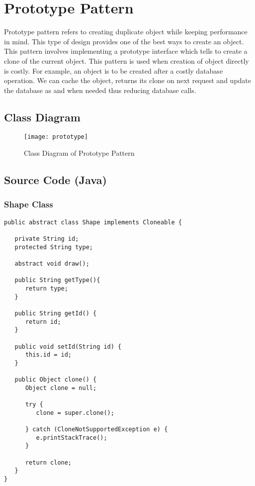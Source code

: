 \newpage
\section{Prototype Pattern}

Prototype pattern refers to creating duplicate object while keeping performance in mind. This type of design provides one of the best ways to create an object.
This pattern involves implementing a prototype interface which tells to create a clone of the current object. This pattern is used when creation of object directly is costly. For example, an object is to be created after a costly database operation. We can cache the object, returns its clone on next request and update the database as and when needed thus reducing database calls.
\subsection{Class Diagram}

\begin{figure}[h]
\centering
\texttt{[image: prototype]}
\caption{Class Diagram of Prototype Pattern}
\end{figure}

\newpage
\subsection{Source Code (Java)}

\subsubsection{Shape Class}

\begin{verbatim}
public abstract class Shape implements Cloneable {
   
   private String id;
   protected String type;
   
   abstract void draw();
   
   public String getType(){
      return type;
   }
   
   public String getId() {
      return id;
   }
   
   public void setId(String id) {
      this.id = id;
   }
   
   public Object clone() {
      Object clone = null;
      
      try {
         clone = super.clone();
         
      } catch (CloneNotSupportedException e) {
         e.printStackTrace();
      }
      
      return clone;
   }
}
\end{verbatim}

